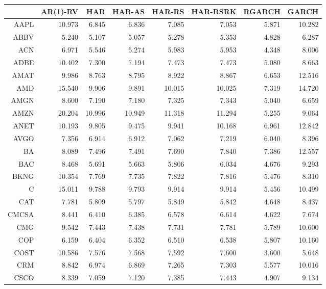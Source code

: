 \begin{table}[ht]
\centering
\begin{tabular}{rrrrrrrr}
  \hline
 & AR(1)-RV & HAR & HAR-AS & HAR-RS & HAR-RSRK & RGARCH & GARCH \\ 
  \hline
AAPL & 10.973 & 6.845 & 6.836 & 7.085 & 7.053 & 5.871 & 10.282 \\ 
  ABBV & 5.240 & 5.107 & 5.057 & 5.278 & 5.353 & 4.828 & 6.287 \\ 
  ACN & 6.971 & 5.546 & 5.274 & 5.983 & 5.953 & 4.348 & 8.006 \\ 
  ADBE & 10.402 & 7.300 & 7.194 & 7.473 & 7.473 & 5.080 & 8.663 \\ 
  AMAT & 9.986 & 8.763 & 8.795 & 8.922 & 8.867 & 6.653 & 12.516 \\ 
  AMD & 15.540 & 9.906 & 9.891 & 10.015 & 10.025 & 7.319 & 14.720 \\ 
  AMGN & 8.600 & 7.190 & 7.180 & 7.325 & 7.343 & 5.040 & 6.659 \\ 
  AMZN & 20.204 & 10.996 & 10.949 & 11.318 & 11.294 & 5.255 & 9.064 \\ 
  ANET & 10.193 & 9.805 & 9.475 & 9.941 & 10.168 & 6.961 & 12.842 \\ 
  AVGO & 7.356 & 6.914 & 6.912 & 7.062 & 7.219 & 6.040 & 8.396 \\ 
  BA & 8.089 & 7.496 & 7.491 & 7.690 & 7.840 & 7.386 & 12.557 \\ 
  BAC & 8.468 & 5.691 & 5.663 & 5.806 & 6.034 & 4.676 & 9.293 \\ 
  BKNG & 10.354 & 7.769 & 7.735 & 7.822 & 7.816 & 5.476 & 8.310 \\ 
  C & 15.011 & 9.788 & 9.793 & 9.914 & 9.914 & 5.456 & 10.499 \\ 
  CAT & 7.781 & 5.809 & 5.797 & 5.849 & 5.842 & 4.648 & 8.437 \\ 
  CMCSA & 8.441 & 6.410 & 6.385 & 6.578 & 6.614 & 4.622 & 7.674 \\ 
  CMG & 9.542 & 7.443 & 7.438 & 7.731 & 7.781 & 5.789 & 10.600 \\ 
  COP & 6.159 & 6.404 & 6.352 & 6.510 & 6.538 & 5.807 & 10.160 \\ 
  COST & 10.586 & 7.576 & 7.568 & 7.592 & 7.600 & 3.600 & 5.648 \\ 
  CRM & 8.842 & 6.974 & 6.869 & 7.265 & 7.303 & 5.577 & 10.016 \\ 
  CSCO & 8.339 & 7.059 & 7.120 & 7.385 & 7.443 & 4.907 & 9.134 \\ 

\end{tabular}
\end{table}
